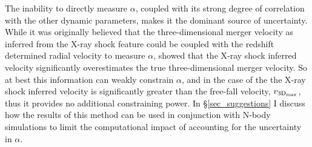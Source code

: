 The inability to directly measure $\alpha$, coupled with its strong degree of correlation with the other dynamic parameters, makes it the dominant source of uncertainty. 
While it was originally believed that the three-dimensional merger velocity as inferred from the X-ray shock feature could be coupled with the redshift determined radial velocity to measure $\alpha$, \citet{Springel:2007bg} showed that the X-ray shock inferred velocity significantly overestimates the true three-dimensional merger velocity.
So at best this information can weakly constrain $\alpha$, and in the case of the  the X-ray shock inferred velocity is significantly greater than the free-fall velocity, $v_{\rm 3D_{max}}$, thus it provides no additional constraining power.
In \S\ref{sec_suggestions} I discuss how the results of this method can be used in conjunction with N-body simulations to limit the computational impact of accounting for the uncertainty in $\alpha$.



